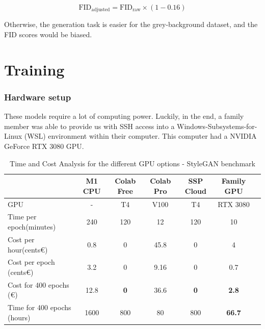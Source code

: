 \documentclass{article}
\begin{document}
\[ \text{FID}_{\text{adjusted}} = \text{FID}_{\text{raw}} \times (1 - 0.16) \]

Otherwise, the generation task is easier for the grey-background dataset, and the FID scores would be biased.

\section{Training}

\subsubsection*{Hardware setup}

These models require a lot of computing power. Luckily, in the end, a family member was able to provide us with SSH access into a Windows-Subsystems-for-Linux (WSL) environment within their computer. This computer had a NVIDIA GeForce RTX 3080 GPU.

\begin{table}[H]
  \centering
  \begin{tabular}{lcccccl}
    \toprule
    & \multicolumn{1}{c}{M1 CPU} & \multicolumn{1}{c}{Colab Free} & \multicolumn{1}{c}{Colab Pro} & \multicolumn{1}{c}{SSP Cloud\footnotemark} & \multicolumn{1}{c}{Family GPU} \\
    \midrule
    GPU & - & T4 & V100 & T4 & RTX 3080 \\
    Time per epoch\footnotemark (minutes) & 240 & 120 & 12 & 120 & 10 \\
    Cost per hour\footnotemark (cents€) & 0.8 & 0 & 45.8\footnotemark & 0 & 4 \\
    Cost per epoch (cents€) & 3.2 & 0 & 9.16 & 0 & 0.7 \\
    Cost for 400 epochs (€) & 12.8 & \textbf{0} & 36.6 & \textbf{0} & \textbf{2.8} \\
    Time for 400 epochs (hours) & 1600 & 800 & 80 & 800 & \textbf{66.7} \\
    \bottomrule
  \end{tabular}
  \caption{Time and Cost Analysis for the different GPU options - StyleGAN benchmark}
\end{table}

\end{document}
